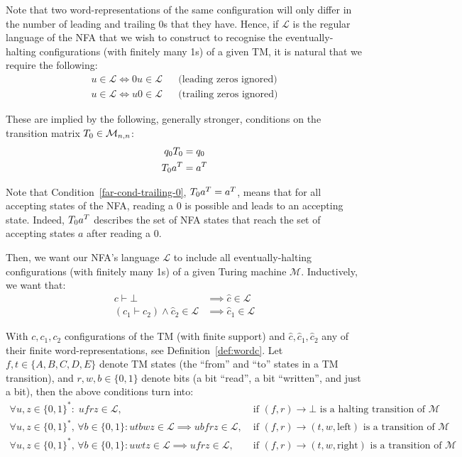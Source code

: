 Note that two word-representations of the same configuration will only differ in the number of leading and trailing 0s that they have. Hence, if $\mathcal{L}$ is the regular language of the NFA that we wish to construct to recognise the eventually-halting configurations (with finitely many 1s) of a given TM, it is natural that we require the following:
\begin{align*}
    u \in \mathcal{L} \iff 0u \in \mathcal{L} &  & \text{(leading zeros ignored)}
    \\
    u \in \mathcal{L} \iff u0 \in \mathcal{L} &  & \text{(trailing zeros ignored)}
\end{align*}

These are implied by the following, generally stronger, conditions on the transition matrix $T_0 \in \mathcal{M}_{n,n}$:
\begin{align}
    q_0 T_0 & = q_0
    \label{far-cond-leading-0}
    \\
    T_0 a^T & = a^T
    \label{far-cond-trailing-0}
\end{align}


Note that Condition~\ref{far-cond-trailing-0}, $T_0 a^T = a^T$, means that for all accepting states of the NFA, reading a 0 is possible and leads to an accepting state. Indeed, $T_0 a^T$ describes the set of NFA states that reach the set of accepting states $a$ after reading a $0$.


Then, we want our NFA's language $\mathcal{L}$ to include all eventually-halting configurations (with finitely many 1s) of a given Turing machine $\mathcal{M}$.  Inductively, we want that:
\begin{align*}
    c\vdash\bot                                    & \implies \hat{c} \in \mathcal{L}  \\
    (c_1\vdash c_2)\land \hat{c}_2 \in \mathcal{L} & \implies\hat{c}_1 \in \mathcal{L}
\end{align*}

With $c, c_1, c_2$ configurations of the TM (with finite support) and $\hat{c}, \hat{c}_1, \hat{c}_2$ any of their finite word-representations, see Definition~\ref{def:wordc}. Let $f,t \in \{A,B,C,D,E\}$ denote TM states (the ``from'' and ``to'' states in a TM transition), and $r,w,b \in \{0,1\}$ denote bits (a bit ``read'', a bit ``written'', and just a bit), then the above conditions turn into:
\begin{align*}
    \forall u,z\in\{0, 1\}^*: \; ufrz \in \mathcal{L},\;                                                           & \text{if $(f,r) \to \bot$ is a halting transition of $\mathcal{M}$}
    \\
    \forall u,z\in\{0, 1\}^*,\,\forall b \in \{0, 1\}: utbwz \in \mathcal{L} \implies ubfrz \in \mathcal{L},\;     & \text{if $(f,r) \to (t,w,\text{left})$ is a transition of $\mathcal{M}$}
    \\
    \forall u,z\in\{0, 1\}^*,\,\forall b \in \{0, 1\}: u w t z \in \mathcal{L} \implies u f r z \in \mathcal{L},\; & \text{if $(f,r) \to (t,w,\text{right})$ is a transition of $\mathcal{M}$}
\end{align*}

